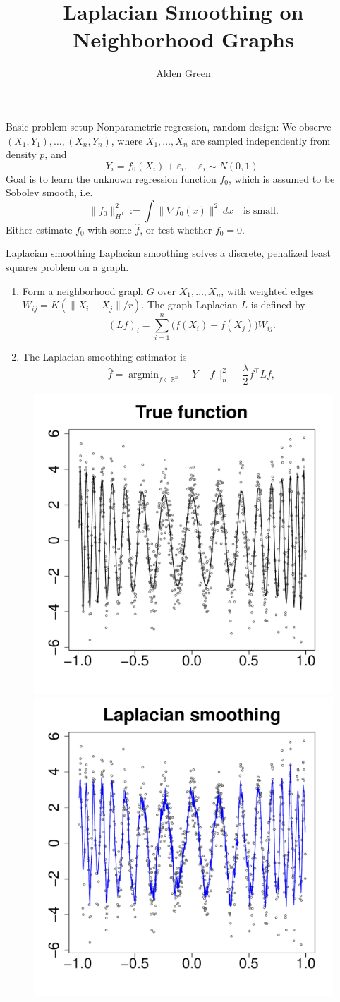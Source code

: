 \documentclass[xcolor=dvipsnames]{beamer}
\title{Laplacian Smoothing on Neighborhood Graphs}
\author{Alden Green}
\institute{Department of Statistics and Data Science \\
		   Carnegie Mellon Unviersity}
\date{}
\newcommand{\Reals}{\mathbb{R}}
\newcommand{\wh}[1]{\widehat{#1}}
\DeclareMathOperator*{\argmin}{argmin}
\begin{document}
	
\begin{frame}
\titlepage
\end{frame}

\begin{frame}{Basic problem setup}
\alert{Nonparametric regression, random design}: We observe $(X_1,Y_1),\ldots,(X_n,Y_n)$, where $X_1,\ldots,X_n$ are sampled independently from density $p$, and
\begin{equation*}
Y_i = f_0(X_i) + \varepsilon_i, \quad \varepsilon_i \sim N(0,1).
\end{equation*}
Goal is to learn the unknown regression function $f_0$, which is assumed to be \alert{Sobolev} smooth, i.e.
\begin{equation*}
\|f_0\|_{H^1}^2 := \int \|\nabla f_0(x)\|^2 \,dx \quad \text{is small.}
\end{equation*}
Either \alert{estimate} $f_0$ with some $\hat{f}$, or \alert{test} whether $f_0 = 0$.
\end{frame}

\begin{frame}{Laplacian smoothing}
Laplacian smoothing solves a discrete, penalized least squares problem on a graph.
\begin{enumerate}
	\item  Form a \alert{neighborhood graph} $G$ over $X_1,\ldots,X_n$, with weighted edges $W_{ij} = K(\|X_i - X_j\|/r)$. The \alert{graph Laplacian} $L$ is defined by
	\begin{equation*}
	(Lf)_i = \sum_{i = 1}^{n} \bigl(f(X_i) - f(X_j)\bigr) W_{ij}.
	\end{equation*}
	\item The \alert{Laplacian smoothing} estimator is
	\begin{equation*}
	\wh{f} = \argmin_{f \in \Reals^n} \|Y - f\|_n^2 + \frac{\lambda}{2} f^{\top} L f, \end{equation*}
\end{enumerate}
\begin{figure}
	\centering
	\includegraphics[width=.25\textwidth]{figures/wiggly_cosine/regression_function_1.pdf}
	\includegraphics[width=.25\textwidth]{figures/wiggly_cosine/laplacian_smoothing_estimate_1.pdf} 
\end{figure}
\end{frame}
\end{document}
